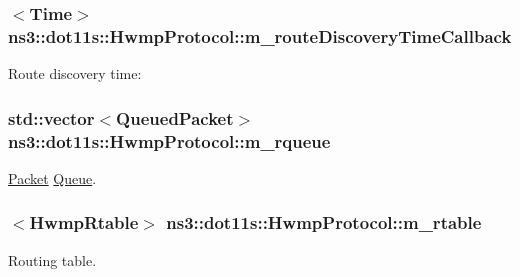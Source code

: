 \subsubsection[{\texorpdfstring{m\+\_\+route\+Discovery\+Time\+Callback}{m_routeDiscoveryTimeCallback}}]{$<${\bf Time}$>$ ns3\+::dot11s\+::\+Hwmp\+Protocol\+::m\+\_\+route\+Discovery\+Time\+Callback\hspace{0.3cm}{\ttfamily [private]}}\hypertarget{classns3_1_1dot11s_1_1HwmpProtocol_a748b1b4837d4ec8e76852a6c450d2f4e}{}\label{classns3_1_1dot11s_1_1HwmpProtocol_a748b1b4837d4ec8e76852a6c450d2f4e}


Route discovery time\+: 

\subsubsection[{\texorpdfstring{m\+\_\+rqueue}{m_rqueue}}]{\setlength{\rightskip}{0pt plus 5cm}std\+::vector$<${\bf Queued\+Packet}$>$ ns3\+::dot11s\+::\+Hwmp\+Protocol\+::m\+\_\+rqueue\hspace{0.3cm}{\ttfamily [private]}}\hypertarget{classns3_1_1dot11s_1_1HwmpProtocol_ad7a0b41b6f5ec7583e8fbda2197d345f}{}\label{classns3_1_1dot11s_1_1HwmpProtocol_ad7a0b41b6f5ec7583e8fbda2197d345f}


\hyperlink{classns3_1_1Packet}{Packet} \hyperlink{classns3_1_1Queue}{Queue}. 

\subsubsection[{\texorpdfstring{m\+\_\+rtable}{m_rtable}}]{$<${\bf Hwmp\+Rtable}$>$ ns3\+::dot11s\+::\+Hwmp\+Protocol\+::m\+\_\+rtable\hspace{0.3cm}{\ttfamily [private]}}\hypertarget{classns3_1_1dot11s_1_1HwmpProtocol_a12fda0e3e5a400888c8ba1a87c1a7216}{}\label{classns3_1_1dot11s_1_1HwmpProtocol_a12fda0e3e5a400888c8ba1a87c1a7216}


Routing table. 

